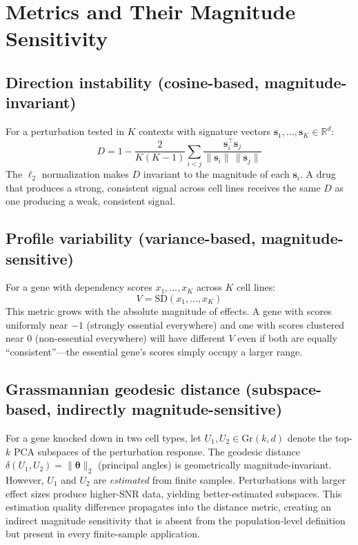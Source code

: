 \documentclass[11pt]{article}
\begin{document}
\section{Metrics and Their Magnitude Sensitivity}

\subsection{Direction instability (cosine-based, magnitude-invariant)}

For a perturbation tested in $K$ contexts with signature vectors
$\mathbf{s}_1, \ldots, \mathbf{s}_K \in \mathbb{R}^d$:
\begin{equation}
  D = 1 - \frac{2}{K(K-1)} \sum_{i < j}
    \frac{\mathbf{s}_i^\top \mathbf{s}_j}
         {\|\mathbf{s}_i\| \, \|\mathbf{s}_j\|}
\end{equation}
The $\ell_2$ normalization makes $D$ invariant to the magnitude of each
$\mathbf{s}_i$. A drug that produces a strong, consistent signal across
cell lines receives the same $D$ as one producing a weak, consistent
signal.

\subsection{Profile variability (variance-based, magnitude-sensitive)}

For a gene with dependency scores $x_1, \ldots, x_K$ across $K$ cell
lines:
\begin{equation}
  V = \text{SD}(x_1, \ldots, x_K)
\end{equation}
This metric grows with the absolute magnitude of effects. A gene with
scores uniformly near $-1$ (strongly essential everywhere) and one with
scores clustered near $0$ (non-essential everywhere) will have different
$V$ even if both are equally ``consistent''---the essential gene's
scores simply occupy a larger range.

\subsection{Grassmannian geodesic distance (subspace-based, indirectly magnitude-sensitive)}

For a gene knocked down in two cell types, let $U_1, U_2 \in
\text{Gr}(k, d)$ denote the top-$k$ PCA subspaces of the perturbation
response. The geodesic distance $\delta(U_1, U_2) =
\|\boldsymbol{\theta}\|_2$ (principal angles) is geometrically
magnitude-invariant. However, $U_1$ and $U_2$ are \emph{estimated} from
finite samples. Perturbations with larger effect sizes produce
higher-SNR data, yielding better-estimated subspaces. This estimation
quality difference propagates into the distance metric, creating an
indirect magnitude sensitivity that is absent from the population-level
definition but present in every finite-sample application.
\end{document}
